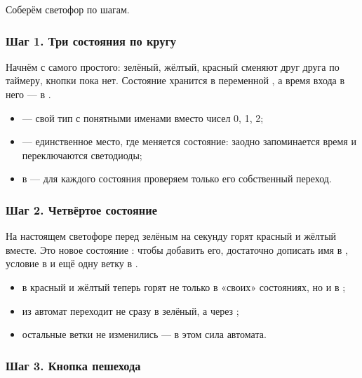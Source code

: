 Соберём светофор по шагам.

\subsubsection{Шаг 1. Три состояния по кругу}

Начнём с самого простого: зелёный, жёлтый, красный сменяют друг друга по таймеру, кнопки пока нет. Состояние
хранится в переменной , а время входа в него --- в .


\begin{itemize}[leftmargin=*]
  \item {} --- свой тип с понятными именами вместо чисел 0, 1, 2;
  \item {} --- единственное место, где меняется состояние: заодно запоминается время и переключаются светодиоды;
  \item {} в  --- для каждого состояния проверяем только его собственный переход.
\end{itemize}

\subsubsection{Шаг 2. Четвёртое состояние}

На настоящем светофоре перед зелёным на секунду горят красный и жёлтый вместе. Это новое состояние
: чтобы добавить его, достаточно дописать имя в , условие в  и
ещё одну ветку в .


\begin{itemize}[leftmargin=*]
  \item в  красный и жёлтый теперь горят не только в «своих» состояниях, но и в ;
  \item из  автомат переходит не сразу в зелёный, а через ;
  \item остальные ветки  не изменились --- в этом сила автомата.
\end{itemize}

\subsubsection{Шаг 3. Кнопка пешехода}

